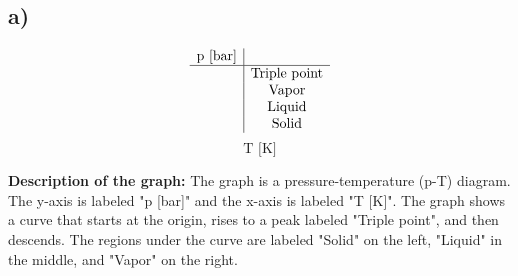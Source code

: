 

\subsection*{a)}
\[
\begin{array}{c|c}
\text{p [bar]} & \\
\hline
& \text{Triple point} \\
& \text{Vapor} \\
& \text{Liquid} \\
& \text{Solid} \\
\end{array}
\]
\[
\text{T [K]}
\]

\textbf{Description of the graph:} The graph is a pressure-temperature (p-T) diagram. The y-axis is labeled "p [bar]" and the x-axis is labeled "T [K]". The graph shows a curve that starts at the origin, rises to a peak labeled "Triple point", and then descends. The regions under the curve are labeled "Solid" on the left, "Liquid" in the middle, and "Vapor" on the right.